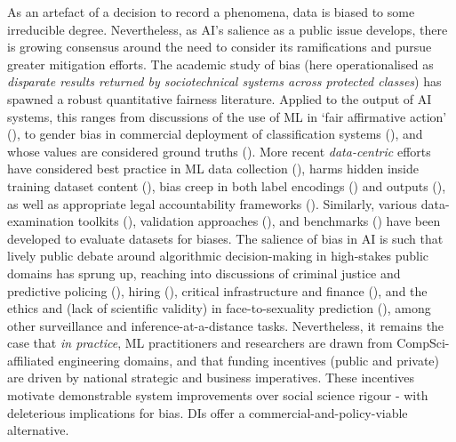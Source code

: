 As an artefact of a decision to record a phenomena, data is biased to some irreducible degree. Nevertheless, as AI’s salience as a public issue develops, there is growing consensus around the need to consider its ramifications and pursue greater mitigation efforts. The academic study of bias (here operationalised as \textit{disparate results returned by sociotechnical systems across protected classes}) has spawned a robust quantitative fairness literature. Applied to the output of AI systems, this ranges from discussions of the use of ML in `fair affirmative action' (\cite{dwork2012FairnessAwareness}), to gender bias in commercial deployment of classification systems (\cite{buolamwini2018GenderShadesIntersectional}), and whose values are considered ground truths (\cite{crawford2021ExcavatingAIPolitics}). More recent \textit{data-centric} efforts have considered best practice in ML data collection (\cite{jo2020LessonsArchivesStrategies}), harms hidden inside training dataset content (\cite{birhane2021MultimodalDatasetsMisogyny}), bias creep in both label encodings (\cite{ghai2020MeasuringSocialBiases, dixon2018MeasuringMitigatingUnintended, miceli2020SubjectivityImpositionPower}) and outputs (\cite{abid2021PersistentAntiMuslimBias, gehman2020RealToxicityPromptsEvaluatingNeural, wolfe2022AmericanWhiteMultimodal}), as well as appropriate legal accountability frameworks (\cite{khan2022SubjectsStagesAI}). Similarly, various data-examination toolkits (\cite{bellamy2018AIFairness360, googleKnowYourData}), validation approaches (\cite{zhao2018GenderBiasCoreference}), and benchmarks (\cite{mazumder2023DataPerfBenchmarksDataCentric, zhao2018GenderBiasCoreference}) have been developed to evaluate datasets for biases. The salience of bias in AI is such that lively public debate around algorithmic decision-making in high-stakes public domains has sprung up, reaching into discussions of criminal justice and predictive policing (\cite{lum2016PredictServe}), hiring (\cite{hiringAlgo}), critical infrastructure and finance (\cite{lin2012NewInvestor}), and the ethics and (lack of scientific validity) in face-to-sexuality prediction (\cite{gehman2020RealToxicityPromptsEvaluatingNeural, wang2022REVISEToolMeasuring}), among other surveillance and inference-at-a-distance tasks. Nevertheless, it remains the case that \textit{in practice}, ML practitioners and researchers are drawn from CompSci-affiliated engineering domains, and that funding incentives (public and private) are driven by national strategic and business imperatives. These incentives motivate demonstrable system improvements over social science rigour - with deleterious implications for bias. DIs offer a commercial-and-policy-viable alternative. 

